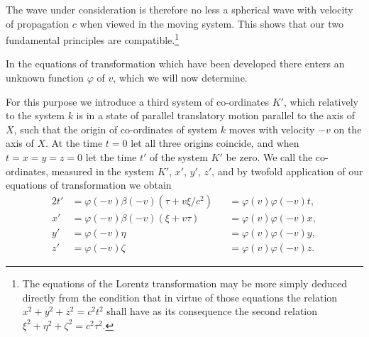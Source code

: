 The wave under consideration is therefore no less a spherical wave with velocity of propagation $c$ when viewed in the moving system. This shows that our two fundamental principles are compatible.\footnote{The equations of the Lorentz transformation may be more simply deduced directly from the condition that in virtue of those equations the relation $x^2 + y^2 + z^2 = c^2 t^2$ shall have as its consequence the second relation $\xi^2 + \eta^2 + \zeta^2 = c^2 \tau^2$.}

In the equations of transformation which have been developed there enters an unknown function $\varphi$ of $v$, which we will now determine.

For this purpose we introduce a third system of co-ordinates $K'$, which relatively to the system $k$ is in a state of parallel translatory motion parallel to the axis of $X$, such that the origin of co-ordinates of system $k$ moves with velocity $-v$ on the axis of $X$. At the time $t = 0$ let all three origins coincide, and when $t=x=y=z=0$ let the time $t'$ of the system $K'$ be zero. We call the co-ordinates, measured in the system $K'$, $x'$, $y'$, $z'$, and by twofold application of our equations of transformation we obtain
\begin{alignat*}{2}
	t' &= \varphi(-v)\beta(-v)(\tau + v\xi/c^2) &&= \varphi(v)\varphi(-v)t, \\
	x' &= \varphi(-v)\beta(-v)(\xi+v\tau) &&= \varphi(v)\varphi(-v)x, \\
	y' &= \varphi(-v)\eta &&= \varphi(v)\varphi(-v)y, \\
	z' &= \varphi(-v)\zeta &&= \varphi(v)\varphi(-v)z.
\end{alignat*}

